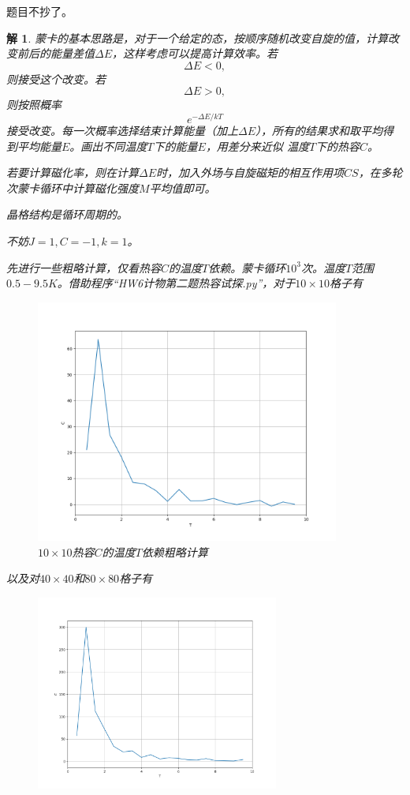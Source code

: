 \documentclass[10pt]{ctexart}
\newtheorem*{solution}{解}
\begin{document}
题目不抄了。
\begin{solution}
    蒙卡的基本思路是，对于一个给定的态，按顺序随机改变自旋的值，计算改变前后的能量差值$\Delta E$，这样考虑可以提高计算效率。若
    $$\Delta E<0,$$
    则接受这个改变。若
    $$\Delta E>0,$$
    则按照概率
    $$e^{-\Delta E/kT}$$
    接受改变。每一次概率选择结束计算能量（加上$\Delta E$），所有的结果求和取平均得到平均能量$E$。画出不同温度$T$下的能量$E$，用差分来近似
    温度$T$下的热容$C$。

    若要计算磁化率，则在计算$\Delta E$时，加入外场与自旋磁矩的相互作用项$CS$，在多轮次蒙卡循环中计算磁化强度$M$平均值即可。

    晶格结构是循环周期的。

    不妨$J=1,C=-1,k=1$。

    先进行一些粗略计算，仅看热容$C$的温度$T$依赖。蒙卡循环$10^3$次。温度$T$范围$0.5-9.5K$。借助程序“HW6计物第二题热容试探.py”，对于$10\times 10$格子有
    \begin{figure}[H]
        \centering
        \includegraphics[width=10cm]{Rough_10.png}
        \caption{$10\times 10$热容$C$的温度$T$依赖粗略计算}
    \end{figure}
    以及对$40\times 40$和$80\times 80$格子有
    \begin{figure}[H]
        \centering
        \begin{minipage}{0.45\linewidth}
            \centering
            \includegraphics[width=8cm]{Rough_40.png}

\end{minipage}
\end{figure}
\end{solution}
\end{document}
